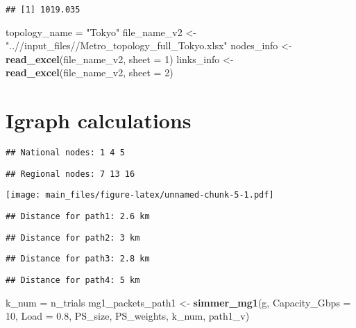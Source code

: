 \documentclass[
]{article}
\newenvironment{Shaded}{\begin{snugshade}}{\end{snugshade}}
\newcommand{\AttributeTok}[1]{\textcolor[rgb]{0.13,0.29,0.53}{#1}}
\newcommand{\DecValTok}[1]{\textcolor[rgb]{0.00,0.00,0.81}{#1}}
\newcommand{\FloatTok}[1]{\textcolor[rgb]{0.00,0.00,0.81}{#1}}
\newcommand{\FunctionTok}[1]{\textcolor[rgb]{0.13,0.29,0.53}{\textbf{#1}}}
\newcommand{\NormalTok}[1]{#1}
\newcommand{\OtherTok}[1]{\textcolor[rgb]{0.56,0.35,0.01}{#1}}
\newcommand{\StringTok}[1]{\textcolor[rgb]{0.31,0.60,0.02}{#1}}
\begin{document}
\begin{verbatim}
## [1] 1019.035
\end{verbatim}

\begin{Shaded}
\begin{Highlighting}[]
\NormalTok{topology\_name }\OtherTok{=} \StringTok{"Tokyo"}
\NormalTok{file\_name\_v2 }\OtherTok{\textless{}{-}} \StringTok{"..//input\_files//Metro\_topology\_full\_Tokyo.xlsx"}
\NormalTok{nodes\_info }\OtherTok{\textless{}{-}} \FunctionTok{read\_excel}\NormalTok{(file\_name\_v2, }\AttributeTok{sheet =} \DecValTok{1}\NormalTok{)}
\NormalTok{links\_info }\OtherTok{\textless{}{-}} \FunctionTok{read\_excel}\NormalTok{(file\_name\_v2, }\AttributeTok{sheet =} \DecValTok{2}\NormalTok{)}
\end{Highlighting}
\end{Shaded}

\hypertarget{igraph-calculations}{%
\section{Igraph calculations}\label{igraph-calculations}}

\begin{verbatim}
## National nodes: 1 4 5
\end{verbatim}

\begin{verbatim}
## Regional nodes: 7 13 16
\end{verbatim}

\texttt{[image: main\_files/figure-latex/unnamed-chunk-5-1.pdf]}

\begin{verbatim}
## Distance for path1: 2.6 km
\end{verbatim}

\begin{verbatim}
## Distance for path2: 3 km
\end{verbatim}

\begin{verbatim}
## Distance for path3: 2.8 km
\end{verbatim}

\begin{verbatim}
## Distance for path4: 5 km
\end{verbatim}

\begin{Shaded}
\begin{Highlighting}[]
\NormalTok{k\_num }\OtherTok{=}\NormalTok{ n\_trials}
\NormalTok{mg1\_packets\_path1 }\OtherTok{\textless{}{-}} \FunctionTok{simmer\_mg1}\NormalTok{(g, }\AttributeTok{Capacity\_Gbps =} \DecValTok{10}\NormalTok{, }\AttributeTok{Load =} \FloatTok{0.8}\NormalTok{, PS\_size, PS\_weights, k\_num, path1\_v)}
\end{Highlighting}
\end{Shaded}
\end{document}
